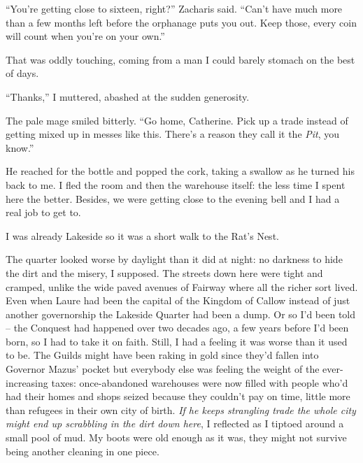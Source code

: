\documentclass[12pt, openany]{book}
\begin{document}
“You’re getting close to sixteen, right?” Zacharis said. “Can’t have much more than a few months left before the orphanage puts you out. Keep those, every coin will count when you’re on your own.”

That was oddly touching, coming from a man I could barely stomach on the best of days.

“Thanks,” I muttered, abashed at the sudden generosity.

The pale mage smiled bitterly. “Go home, Catherine. Pick up a trade instead of getting mixed up in messes like this. There’s a reason they call it the \textit{Pit}, you know.”

He reached for the bottle and popped the cork, taking a swallow as he turned his back to me. I fled the room and then the warehouse itself: the less time I spent here the better. Besides, we were getting close to the evening bell and I had a real job to get to.

I was already Lakeside so it was a short walk to the Rat’s Nest. 

The quarter looked worse by daylight than it did at night: no darkness to hide the dirt and the misery, I supposed. The streets down here were tight and cramped, unlike the wide paved avenues of Fairway where all the richer sort lived. Even when Laure had been the capital of the Kingdom of Callow instead of just another governorship the Lakeside Quarter had been a dump. Or so I’d been told – the Conquest had happened over two decades ago, a few years before I’d been born, so I had to take it on faith. Still, I had a feeling it was worse than it used to be. The Guilds might have been raking in gold since they’d fallen into Governor Mazus’ pocket but everybody else was feeling the weight of the ever-increasing taxes: once-abandoned warehouses were now filled with people who’d had their homes and shops seized because they couldn’t pay on time, little more than refugees in their own city of birth. \textit{If he keeps strangling trade the whole city might end up scrabbling in the dirt down here}, I reflected as I tiptoed around a small pool of mud. My boots were old enough as it was, they might not survive being another cleaning in one piece.
\end{document}
